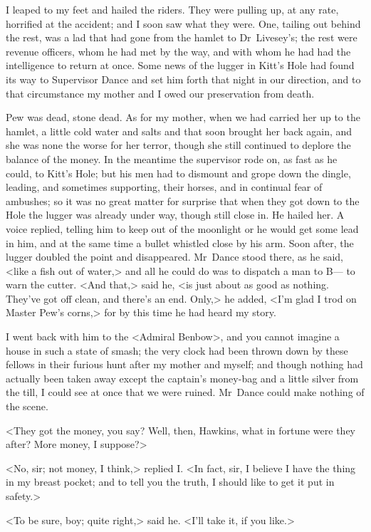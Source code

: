 I leaped to my feet and hailed the riders. They were pulling up, at any rate, horrified at the accident; and I soon saw what they were. One, tailing out behind the rest, was a lad that had gone from the hamlet to Dr~Livesey's; the rest were revenue officers, whom he had met by the way, and with whom he had had the intelligence to return at once. Some news of the lugger in Kitt's Hole had found its way to Supervisor Dance and set him forth that night in our direction, and to that circumstance my mother and I owed our preservation from death.

Pew was dead, stone dead. As for my mother, when we had carried her up to the hamlet, a little cold water and salts and that soon brought her back again, and she was none the worse for her terror, though she still continued to deplore the balance of the money. In the meantime the supervisor rode on, as fast as he could, to Kitt's Hole; but his men had to dismount and grope down the dingle, leading, and sometimes supporting, their horses, and in continual fear of ambushes; so it was no great matter for surprise that when they got down to the Hole the lugger was already under way, though still close in. He hailed her. A voice replied, telling him to keep out of the moonlight or he would get some lead in him, and at the same time a bullet whistled close by his arm. Soon after, the lugger doubled the point and disappeared. Mr~Dance stood there, as he said, <like a fish out of water,> and all he could do was to dispatch a man to B— to warn the cutter. <And that,> said he, <is just about as good as nothing. They've got off clean, and there's an end. Only,> he added, <I'm glad I trod on Master Pew's corns,> for by this time he had heard my story.

I went back with him to the <Admiral Benbow>, and you cannot imagine a house in such a state of smash; the very clock had been thrown down by these fellows in their furious hunt after my mother and myself; and though nothing had actually been taken away except the captain's money-bag and a little silver from the till, I could see at once that we were ruined. Mr~Dance could make nothing of the scene.

<They got the money, you say? Well, then, Hawkins, what in fortune were they after? More money, I suppose?>

<No, sir; not money, I think,> replied I\@. <In fact, sir, I believe I have the thing in my breast pocket; and to tell you the truth, I should like to get it put in safety.>

<To be sure, boy; quite right,> said he. <I'll take it, if you like.>


